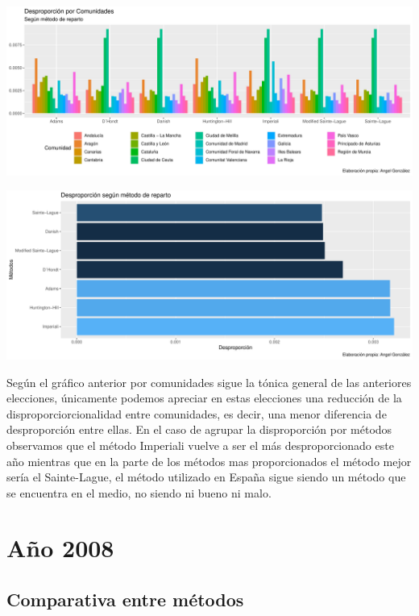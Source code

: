 \documentclass[12pt,a4paper,]{book}
\numberwithin{dummy}{section}
\theoremstyle{ocrenumbox}
\theoremstyle{blacknumex}
\theoremstyle{blacknumbox}
\theoremstyle{ocrenum}
\theoremstyle{ocrenum}
\begin{document}
\begin{center}\includegraphics[width=0.95\linewidth]{figurasR/unnamed-chunk-132-1} \end{center}

\begin{center}\includegraphics[width=0.95\linewidth]{figurasR/unnamed-chunk-132-2} \end{center}

Según el gráfico anterior por comunidades sigue la tónica general de las
anteriores elecciones, únicamente podemos apreciar en estas elecciones
una reducción de la disproporciorcionalidad entre comunidades, es decir,
una menor diferencia de desproporción entre ellas. En el caso de agrupar
la disproporción por métodos observamos que el método Imperiali vuelve a
ser el más desproporcionado este año mientras que en la parte de los
métodos mas proporcionados el método mejor sería el Sainte-Lague, el
método utilizado en España sigue siendo un método que se encuentra en el
medio, no siendo ni bueno ni malo.

\hypertarget{auxf1o-2008}{%
\section{Año 2008}\label{auxf1o-2008}}

\hypertarget{comparativa-entre-muxe9todos-9}{%
\subsection{Comparativa entre
métodos}\label{comparativa-entre-muxe9todos-9}}
\end{document}
